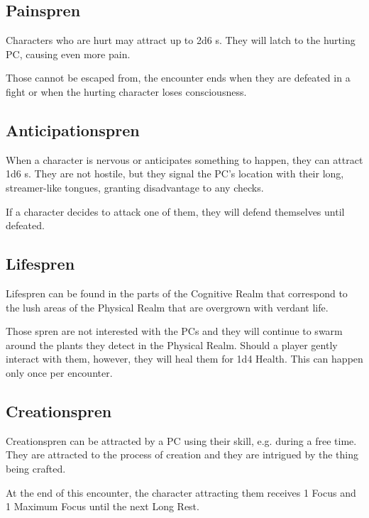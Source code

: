 


\subsection{Painspren}

Characters who are hurt may attract up to 2d6 \enemyPainSpren{}s. They will latch to the hurting PC, causing even more pain.

Those cannot be escaped from, the encounter ends when they are defeated in a fight or when the hurting character loses consciousness. 




\subsection{Anticipationspren}

When a character is nervous or anticipates something to happen, they can attract 1d6 \enemyAnticipationSpren{}s. They are not hostile, but they signal the PC's location with their long, streamer-like tongues, granting disadvantage to any \skillStealth{} checks.

If a character decides to attack one of them, they will defend themselves until defeated.



\subsection{Lifespren}

Lifespren can be found in the parts of the Cognitive Realm that correspond to the lush areas of the Physical Realm that are overgrown with verdant life.

Those spren are not interested with the PCs and they will continue to swarm around the plants they detect in the Physical Realm. Should a player gently interact with them, however, they will heal them for 1d4 Health. This can happen only once per encounter.




\subsection{Creationspren}

Creationspren can be attracted by a PC using their \skillCrafting{} skill, e.g. during a free time. They are attracted to the process of creation and they are intrigued by the thing being crafted.

At the end of this encounter, the character attracting them receives 1 Focus and 1 Maximum Focus until the next Long Rest.

